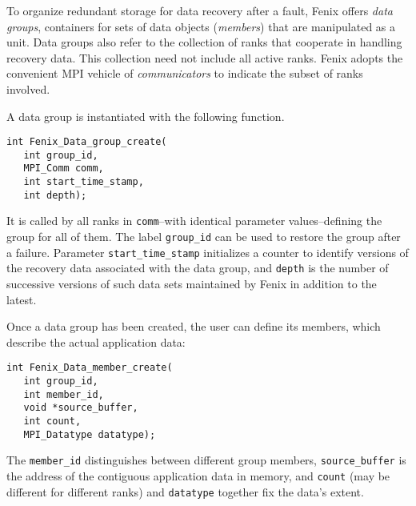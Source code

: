 To organize redundant storage for data recovery after a fault,
Fenix offers \textit{data groups}, containers for sets of data objects 
(\textit{members}) that are manipulated as a unit.
Data groups also refer to the collection of ranks that
cooperate in handling recovery data.
This collection need not include all active ranks.
Fenix adopts the convenient MPI vehicle of \textit{communicators} to
indicate the subset of ranks involved.

A data group is instantiated with the following function.
\begin{verbatim}
int Fenix_Data_group_create(
   int group_id,
   MPI_Comm comm, 
   int start_time_stamp, 
   int depth);
\end{verbatim}

It is called by all ranks in \texttt{comm}--with identical 
parameter values--defining the group for all of them. 
The label \texttt{group\_id} can be used to restore the group after a failure.
Parameter \texttt{start\_time\_stamp} initializes a counter to identify versions
of the recovery data associated with the data group, and \texttt{depth} is
the number of successive versions of such data sets maintained by Fenix
in addition to the latest.

Once a data group has been created, the user can define its members, which describe
the actual application data:
\begin{verbatim}
int Fenix_Data_member_create( 
   int group_id, 
   int member_id,
   void *source_buffer, 
   int count, 
   MPI_Datatype datatype);
\end{verbatim}
The \texttt{member\_id} distinguishes between different group 
members, \texttt{source\_buffer} is the address of the contiguous application data in memory,
and \texttt{count} (may be different for different ranks) and \texttt{datatype} together 
fix the data's extent.

